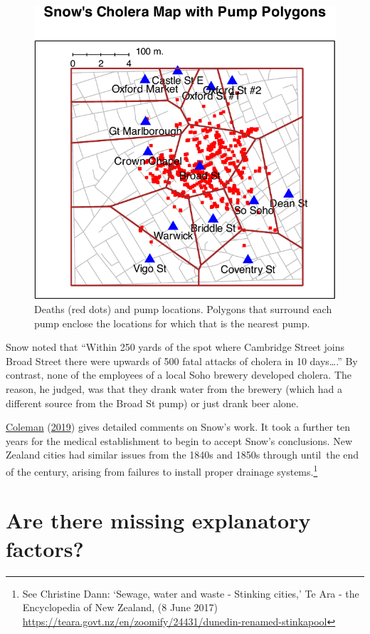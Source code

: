 \documentclass[
  10pt,
  b5paper]{book}
\begin{document}
\begin{figure}[H]

{\centering \includegraphics[width=0.6\linewidth]{08-observational_files/figure-latex/pump-1} 

}

\caption{Deaths (red dots) and pump locations.  Polygons that surround
each pump enclose the locations for which that is the nearest pump.}\label{fig:pump}
\end{figure}

Snow noted that ``Within 250 yards of the spot where Cambridge
Street joins Broad Street there were upwards of 500 fatal
attacks of cholera in 10 days\ldots{}.'' By contrast, none of the
employees of a local Soho brewery developed cholera.
The reason, he judged, was that they drank water from
the brewery (which had a different source from the Broad
St pump) or just drank beer alone.

\protect\hyperlink{ref-coleman2019causality}{Coleman} (\protect\hyperlink{ref-coleman2019causality}{2019}) gives detailed comments on Snow's work.
It took a further ten years for the medical establishment to
begin to accept Snow's conclusions. New Zealand cities
had similar issues from the 1840s and 1850s through until~the
end of the century, arising from failures to install proper
drainage systems.\footnote{See Christine Dann: `Sewage, water and
  waste - Stinking cities,' Te Ara - the Encyclopedia of New
  Zealand, (8 June 2017) \url{https://teara.govt.nz/en/zoomify/24431/dunedin-renamed-stinkapool}}

\hypertarget{sec:maternity}{%
\section{Are there missing explanatory factors?}\label{sec:maternity}}
\end{document}
